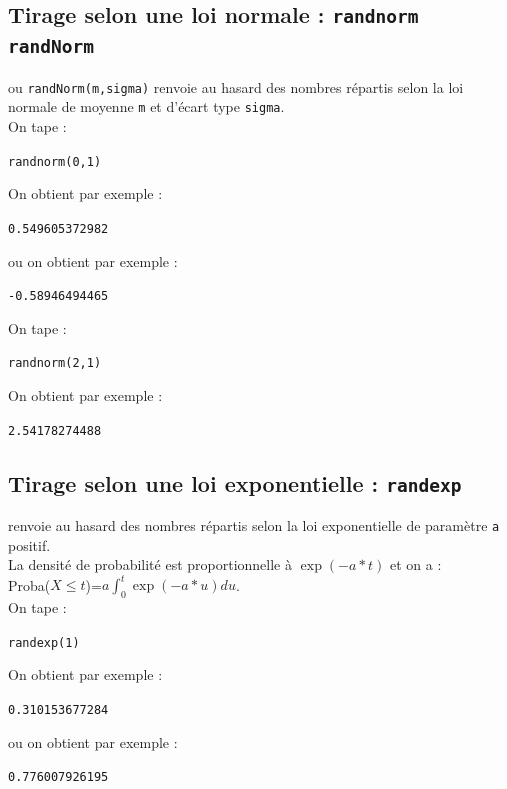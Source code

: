 \documentclass[a4paper,11pt]{book}
\begin{document}
\subsection{Tirage selon une loi normale : {\tt randnorm randNorm}}
 ou {\tt randNorm(m,sigma)} renvoie au hasard 
des nombres r\'epartis selon la loi normale de moyenne {\tt  m} et d'\'ecart 
type {\tt sigma}.\\
On tape :
\begin{center}{\tt randnorm(0,1)}\end{center}
On obtient par exemple :
\begin{center}{\tt 0.549605372982}\end{center}
ou on obtient par exemple :
\begin{center}{\tt  -0.58946494465}\end{center}
On tape :
\begin{center}{\tt randnorm(2,1)}\end{center}
On obtient par exemple :
\begin{center}{\tt 2.54178274488}\end{center}
\subsection{Tirage selon une loi exponentielle : {\tt randexp}}
 renvoie au hasard 
des nombres r\'epartis selon la loi exponentielle de param\`etre {\tt a}
positif.\\
La densit\'e de probabilit\'e est proportionnelle \`a $\exp(-a*t)$ et on a :\\
Proba($X\leq t$)=$a\int_0^t\exp(-a*u)du$.\\
On tape :
\begin{center}{\tt randexp(1)}\end{center}
On obtient par exemple :
\begin{center}{\tt 0.310153677284}\end{center}
ou on obtient par exemple :
\begin{center}{\tt 0.776007926195}\end{center}
\end{document}
